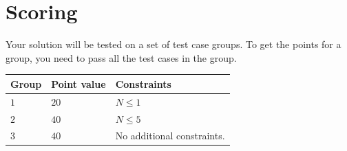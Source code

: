 \section*{Scoring}
Your solution will be tested on a set of test case groups.
To get the points for a group, you need to pass all the test cases in the group.

\noindent
\begin{tabular}{| l | l | p{12cm} |}
  \hline
  \textbf{Group} & \textbf{Point value} & \textbf{Constraints} \\ \hline
  $1$    & $20$        & $N \le 1$ \\ \hline 
  $2$    & $40$        & $N \le 5$ \\ \hline
  $3$    & $40$        & No additional constraints. \\ \hline
\end{tabular}

